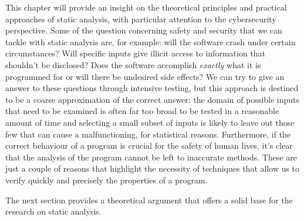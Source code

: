 \documentclass[12pt,a4paper]{book}
\theoremstyle{definition}
\begin{document}
	This chapter will provide an insight on the theoretical principles and practical approaches of static analysis, with particular attention to the cybersecurity perspective. Some of the question concerning safety and security that we can tackle with static analysis are, for example: will the software crash under certain circumstances? Will specific inputs give illicit access to information that shouldn't be disclosed? Does the software accomplish \textit{exactly} what it is programmed for or will there be undesired side effects? We can try to give an answer to these questions through intensive testing, but this approach is destined to be a coarse approximation of the correct answer: the domain of possible inputs that need to be examined is often far too broad to be tested in a reasonable amount of time and selecting a small subset of inputs is likely to leave out those few that can cause a malfunctioning, for statistical reasons. Furthermore, if the correct behaviour of a program is crucial for the safety of human lives, it's clear that the analysis of the program cannot be left to inaccurate methods.
	These are just a couple of reasons that highlight the necessity of techniques that allow us to verify quickly and precisely the properties of a program.
	
	The next section provides a theoretical argument that offers a solid base for the research on static analysis.
\end{document}
